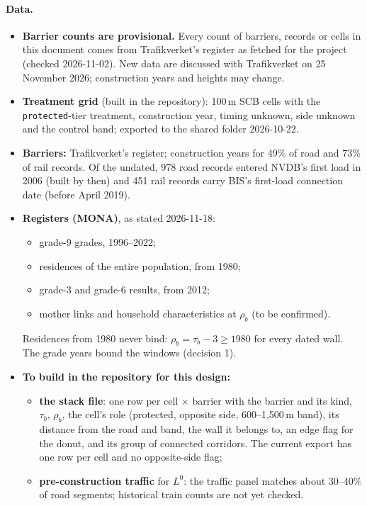 \documentclass[11pt]{article}
\begin{document}
\paragraph{Data.}
\begin{itemize}
\item \textbf{Barrier counts are provisional.} Every count of barriers, records or cells in this
  document comes from Trafikverket's register as fetched for the project (checked 2026-11-02).
  New data are discussed with Trafikverket on 25 November 2026; construction years and
  heights may change.
\item \textbf{Treatment grid} (built in the repository): 100\,m SCB cells with the
  \texttt{protected}-tier treatment, construction year, timing unknown, side unknown and the
  control band; exported to the shared folder 2026-10-22.
\item \textbf{Barriers:} Trafikverket's register; construction years for 49\% of road and 73\%
  of rail records. Of the undated, 978 road records entered NVDB's first load in 2006 (built by
  then) and 451 rail records carry BIS's first-load connection date (before April 2019).
\item \textbf{Registers (MONA)}, as stated 2026-11-18:
  \begin{itemize}
  \item grade-9 grades, 1996--2022;
  \item residences of the entire population, from 1980;
  \item grade-3 and grade-6 results, from 2012;
  \item mother links and household characteristics at \(\rho_b\) (to be confirmed).
  \end{itemize}
  Residences from 1980 never bind: \(\rho_b = \tau_b - 3 \ge 1980\) for every dated wall. The
  grade years bound the windows (decision 1).
\item \textbf{To build in the repository for this design:}
  \begin{itemize}
  \item \textbf{the stack file}: one row per cell \(\times\) barrier with the barrier and its
    kind, \(\tau_b\), \(\rho_b\), the cell's role (protected, opposite side, 600--1,500\,m band),
    its distance from the road and band, the wall it belongs to, an edge flag for the donut, and
    its group of connected corridors. The current export has one row per cell and no
    opposite-side flag;
  \item \textbf{pre-construction traffic} for \(L^0\): the traffic panel matches about 30--40\%
    of road segments; historical train counts are not yet checked.
  \end{itemize}
\end{itemize}
\end{document}
